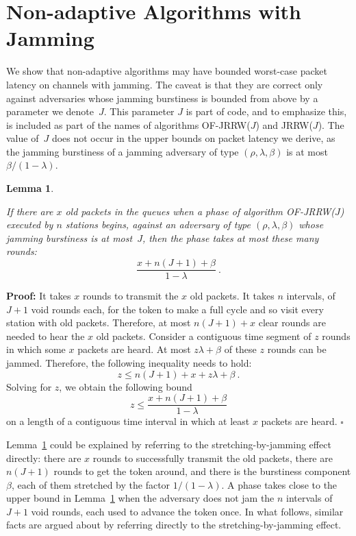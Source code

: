 \documentclass[11pt]{article}
\newcommand{\qed}{\hfill $\square$}
\newtheorem{lemma}{Lemma}
\newenvironment{proof}{\noindent\textbf{Proof: }}{\qed \smallbreak}
\begin{document}
\section{Non-adaptive Algorithms with Jamming}

\label{sec:non-adaptive-algorithms-with-jamming}


We show that non-adaptive algorithms may have bounded worst-case packet latency on channels with jamming.  
The caveat is that they are correct only  against adversaries whose jamming burstiness is bounded from above by a parameter we denote~$J$.
This parameter $J$ is part of code, and to emphasize this, is included as part of the names of algorithms \textsc{OF-JRRW($J$)} and \textsc{JRRW($J$)}.
The value of~$J$ does not occur in the upper bounds on packet latency we derive, as the jamming burstiness of a jamming adversary of type $(\rho,\lambda,\beta)$ is at most $\beta/(1-\lambda)$.


\begin{lemma}
\label{lem:cycle-plus-packets}

If there are $x$ old packets in the queues when a phase of algorithm \textsc{OF-JRRW($J$)} executed by $n$ stations begins, against an adversary of type $(\rho,\lambda,\beta)$ whose jamming burstiness is at most~$J$, then the phase takes at most these many rounds:
\[
\frac{x + n(J+1) + \beta}{1-\lambda}
\ .
\] 
\end{lemma}


\begin{proof}
It takes $x$ rounds to transmit the $x$ old packets.
It takes $n$ intervals, of $J+1$ void rounds each, for the token to make a full cycle and so  visit every station with old packets.
Therefore, at most $n(J+1)+x$ clear rounds are needed to hear the $x$ old packets. 
Consider a contiguous time segment of $z$ rounds in which some $x$ packets are heard. 
At most $z \lambda + \beta$ of these $z$ rounds can be jammed. 
Therefore, the following inequality needs to hold:
\[
z \le   n (J+1) + x + z \lambda + \beta
\ .
\] 
Solving for $z$, we obtain the following bound
\[
z \le \frac{x + n(J+1)+\beta}{1-\lambda}
\]
on a length of a contiguous time interval in which at least $x$ packets are heard.
\end{proof}

Lemma~\ref{lem:cycle-plus-packets} could be explained by referring to the stretching-by-jamming effect directly: there are $x$ rounds to successfully transmit the old packets, there are $n (J+1)$ rounds to get the token around, and there is the burstiness component $\beta$, each of them stretched by the factor $1/(1-\lambda)$.
A phase takes close to the upper bound in Lemma~\ref{lem:cycle-plus-packets} when the adversary does not jam the $n$ intervals of $J+1$ void rounds, each used to advance the token once.
In what follows, similar facts are argued about by referring directly to the stretching-by-jamming effect.
\end{document}

